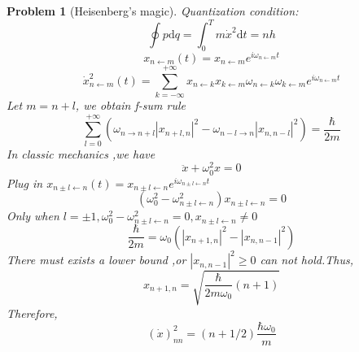 \documentclass{article}
\theoremstyle{t}
\newtheorem{problem}{Problem}
\newcommand{\dd}{\mathrm{d}}
\begin{document}
\begin{problem}[Heisenberg’s magic]
    Quantization condition:
    \begin{equation}
        \oint p\dd q=\int_{0}^{T}m\dot{x}^2\dd t=nh
    \end{equation}
    \begin{equation}
        x_{n\leftarrow m}(t)=x_{n \leftarrow m}e^{i \omega_{n\leftarrow m}t}
    \end{equation}
    \begin{equation}
        \dot{x}^2_{n\leftarrow m }(t)=\sum_{k=-\infty}^{+\infty}x_{n \leftarrow k}x_{k \leftarrow m}\omega_{n\leftarrow k}\omega_{k\leftarrow m}e^{i \omega_{n\leftarrow m}t}
    \end{equation}
    Let $m=n+l$, we obtain f-sum rule
    \begin{equation}
        \sum_{l=0}^{+\infty} \left( \omega_{n \to n + l} \left| x_{n + l, n} \right|^2 - \omega_{n-l \to n} \left| x_{n,n-l} \right|^2 \right) = \frac{\hbar}{2m} 
    \end{equation}
    In classic mechanics ,we have
    \begin{equation}
        \ddot{x}+\omega_0^2 x=0
    \end{equation}
    Plug in $x_{n\pm l\leftarrow n}(t)=x_{n\pm l\leftarrow n}e^{i \omega_{n\pm l\leftarrow n}t}$
    \begin{equation}
        (\omega_0^2-\omega_{n\pm l\leftarrow n}^2)x_{n\pm l\leftarrow n}=0
    \end{equation}
    Only when $l=\pm 1,\omega_0^2-\omega_{n\pm l\leftarrow n}^2=0,x_{n\pm l\leftarrow n}\not=0$
    \begin{equation}
        \frac{\hbar}{2m} = \omega_0 \left( |x_{n+1,n}|^2 - |x_{n,n-1}|^2 \right)
    \end{equation}
    There must exists a lower bound ,or $\left|x_{n,n-1}\right|^2\ge 0$ can not hold.Thus,
    \begin{equation}
        x_{n+1,n}=\sqrt{\frac{\hbar}{2m\omega_0}(n+1)}
    \end{equation}
    Therefore,
    \begin{equation}
        (\dot{x})_{nn}^{2} = (n + 1/2) \frac{\hbar \omega_0}{m}
    \end{equation}
\end{problem}
\end{document}
